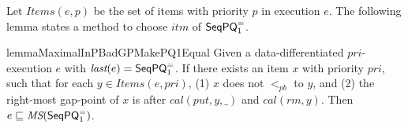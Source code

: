 Let $\textit{Items}(e,p)$ be the set of items with priority $p$ in execution $e$. The following lemma states a method to choose $\textit{itm}$ of $\mathsf{SeqPQ}_1^{=}$.

\begin{restatable}{lemma}{MaximalInPBadGPMakePQ1Equal}
\label{lemma:maximal in pb and gap-point make a candidate of EPQ1Equal}
Given a data-differentiated $\textit{pri}$-execution $e$ with $\textit{last}(e) = \mathsf{SeqPQ}_1^{=}$. If there exists an item $x$ with priority $\textit{pri}$, such that for each $y \in \textit{Items}(e,\textit{pri})$, (1) $x$ does not $<_{\textit{pb}}$ to $y$, and (2) the right-most gap-point of $x$ is after $\textit{cal}(\textit{put},y,\_)$ and $\textit{cal}(\textit{rm},y)$. Then $e \sqsubseteq \textit{MS}(\mathsf{SeqPQ}_1^{=})$.
\end{restatable}

